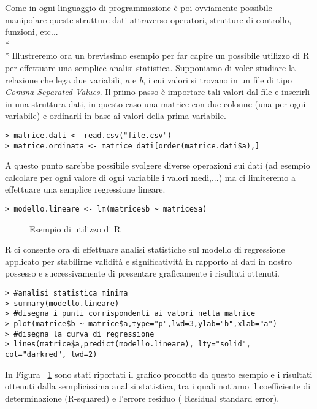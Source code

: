\documentclass[12pt,a4paper,openright,twoside]{report}
\begin{document}
Come in ogni linguaggio di programmazione è poi ovviamente possibile manipolare queste strutture dati attraverso operatori, strutture di controllo, funzioni, etc...\\* \\*
Illustreremo ora un brevissimo esempio per far capire un possibile utilizzo di R per effettuare una semplice analisi statistica. Supponiamo di voler studiare la relazione che lega due variabili, \emph{a} e \emph{b}, i cui valori si trovano in un file di tipo \emph{Comma Separated Values}. Il primo passo è importare tali valori dal file e inserirli in una struttura dati, in questo caso una matrice con due colonne (una per ogni variabile) e ordinarli in base ai valori della prima variabile.

\lstset{language=R}
\begin{lstlisting}
> matrice.dati <- read.csv("file.csv")
> matrice.ordinata <- matrice_dati[order(matrice.dati$a),]
\end{lstlisting}

A questo punto sarebbe possibile svolgere diverse operazioni sui dati (ad esempio calcolare per ogni valore di ogni variabile i valori medi,...) ma ci limiteremo a effettuare una semplice regressione lineare.
\begin{lstlisting}
> modello.lineare <- lm(matrice$b ~ matrice$a)
\end{lstlisting}

\begin{figure}[hbt]
	\centering
	\quad
	\caption{Esempio di utilizzo di R}
	\label{example_r}
\end{figure}

R ci consente ora di effettuare analisi statistiche sul modello di regressione applicato per stabilirne validità e significatività in rapporto ai dati in nostro possesso e successivamente di presentare graficamente i risultati ottenuti.
\begin{lstlisting}
> #analisi statistica minima
> summary(modello.lineare)       
> #disegna i punti corrispondenti ai valori nella matrice
> plot(matrice$b ~ matrice$a,type="p",lwd=3,ylab="b",xlab="a")    
> #disegna la curva di regressione
> lines(matrice$a,predict(modello.lineare), lty="solid", col="darkred", lwd=2)    
\end{lstlisting}


In Figura ~\ref{example_r} sono stati riportati il grafico prodotto da questo esempio e i risultati ottenuti dalla semplicissima analisi statistica, tra i quali notiamo il coefficiente di determinazione (R-squared) e l'errore residuo ( 
Residual standard error).
\end{document}
